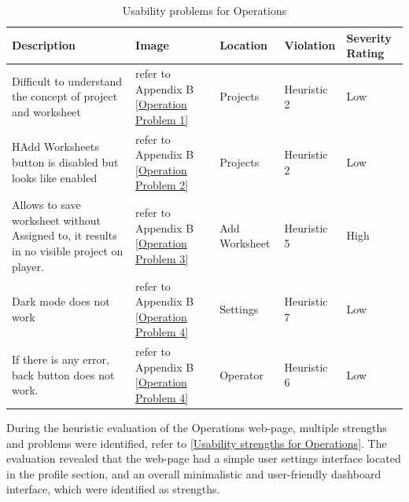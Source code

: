 \documentclass[conference,onecolumn]{IEEEtran}
\begin{document}
            \begin{table}[H]	
                \begin{center}
                \begin{tabular}[H]{ |m{7cm}|m{3cm}|m{2cm}|m{2cm}|m{2cm}|}
                        \hline
                        \textbf{Description}&\textbf{Image} &\textbf{Location} &\textbf{Violation} &\textbf{Severity Rating}  \\ \hline
                        Difficult to understand the concept of project and worksheet	                            &refer to Appendix B \figurename{\ref{Operation Problem 1}} &Projects        &Heuristic 2 &Low  \\ \hline
                        HAdd Worksheets button is disabled but looks like enabled 	                                &refer to Appendix B \figurename{\ref{Operation Problem 2}} &Projects        &Heuristic 2 &Low  \\ \hline
                        Allows to save worksheet without Assigned to, it results in no visible project on player.   &refer to Appendix B \figurename{\ref{Operation Problem 3}} &Add Worksheet   &Heuristic 5 &High  \\ \hline
                        Dark mode does not work 	                                                                &refer to Appendix B \figurename{\ref{Operation Problem 4}} &Settings        &Heuristic 7 &Low   \\ \hline
                        If there is any error, back button does not work. 	                                        &refer to Appendix B \figurename{\ref{Operation Problem 4}} &Operator        &Heuristic 6 &Low   \\ 
                        \hline
                    \end{tabular}
                \end{center}
                \caption{Usability problems for Operations}
                \label{Usability problems for Operations}
            \end{table}

            During the heuristic evaluation of the Operations web-page, multiple strengths and problems were identified, refer to \tablename{ \ref{Usability strengths for Operations}}. The evaluation revealed that the web-page had a simple user settings interface located in the profile section, and an overall minimalistic and user-friendly dashboard interface, which were identified as strengths.
\end{document}
